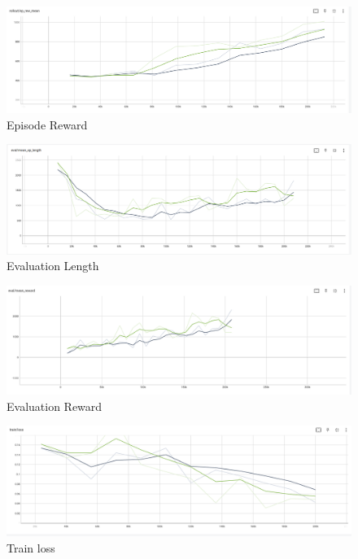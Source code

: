 \begin{figure}[ht]
	\centering
	\includegraphics[width=1\linewidth]{Results/PPO_CNN/ep_reward.png}
	\caption{ Episode Reward }
	\label{f:g2}	
\end{figure}

\begin{figure}[ht]
	\centering
	\includegraphics[width=1\linewidth]{Results/PPO_CNN/eval_length.png}
	\caption{ Evaluation Length}
	\label{f:g3}	
\end{figure}

\begin{figure}[ht]
	\centering
	\includegraphics[width=1\linewidth]{Results/PPO_CNN/eval_reward.png}
	\caption{ Evaluation Reward}
	\label{f:g4}	
\end{figure}


\begin{figure}[ht]
	\centering
	\includegraphics[width=1\linewidth]{Results/PPO_CNN/train_loss.png}
	\caption{Train loss}
	\label{f:g5}	
\end{figure}

